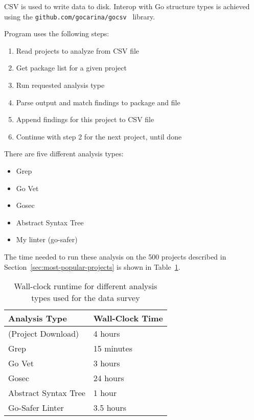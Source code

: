 CSV is used to write data to disk.
Interop with Go structure types is achieved using the \texttt{github.com/gocarina/gocsv}~\cite{gocsv} library.

Program uses the following steps:

\begin{enumerate}
    \item Read projects to analyze from CSV file
    \item Get package list for a given project
    \item Run requested analysis type
    \item Parse output and match findings to package and file
    \item Append findings for this project to CSV file
    \item Continue with step 2 for the next project, until done
\end{enumerate}

There are five different analysis types:

\begin{itemize}
    \item Grep
    \item Go Vet
    \item Gosec
    \item Abstract Syntax Tree
    \item My linter (go-safer)
\end{itemize}

The time needed to run these analysis on the 500 projects described in Section~\ref{sec:most-popular-projects} is shown
in Table~\ref{tbl:survey-analysis-wallclocktime}.

\begin{table}[h]
    \centering
    \caption{Wall-clock runtime for different analysis types used for the data survey}
    \label{tbl:survey-analysis-wallclocktime}
    \begin{tabular}{ll}
        \toprule
        Analysis Type & Wall-Clock Time \\
        \midrule
        (Project Download) & 4 hours \\
        Grep & 15 minutes \\
        Go Vet & 3 hours \\
        Gosec & 24 hours \\
        Abstract Syntax Tree & 1 hour \\
        Go-Safer Linter & 3.5 hours \\
        \bottomrule
    \end{tabular}
\end{table}


